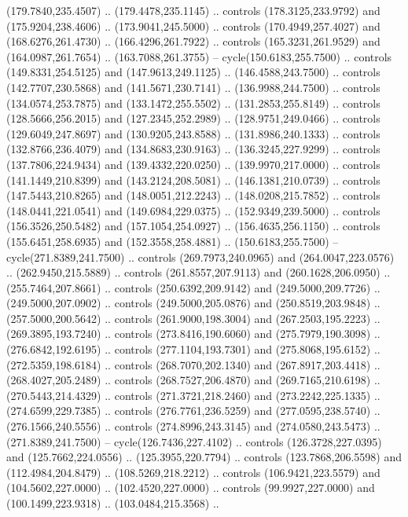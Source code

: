   (179.7840,235.4507) .. (179.4478,235.1145) .. controls (178.3125,233.9792) and
  (175.9204,238.4606) .. (173.9041,245.5000) .. controls (170.4949,257.4027) and
  (168.6276,261.4730) .. (166.4296,261.7922) .. controls (165.3231,261.9529) and
  (164.0987,261.7654) .. (163.7088,261.3755) -- cycle(150.6183,255.7500) ..
  controls (149.8331,254.5125) and (147.9613,249.1125) .. (146.4588,243.7500) ..
  controls (142.7707,230.5868) and (141.5671,230.7141) .. (136.9988,244.7500) ..
  controls (134.0574,253.7875) and (133.1472,255.5502) .. (131.2853,255.8149) ..
  controls (128.5666,256.2015) and (127.2345,252.2989) .. (128.9751,249.0466) ..
  controls (129.6049,247.8697) and (130.9205,243.8588) .. (131.8986,240.1333) ..
  controls (132.8766,236.4079) and (134.8683,230.9163) .. (136.3245,227.9299) ..
  controls (137.7806,224.9434) and (139.4332,220.0250) .. (139.9970,217.0000) ..
  controls (141.1449,210.8399) and (143.2124,208.5081) .. (146.1381,210.0739) ..
  controls (147.5443,210.8265) and (148.0051,212.2243) .. (148.0208,215.7852) ..
  controls (148.0441,221.0541) and (149.6984,229.0375) .. (152.9349,239.5000) ..
  controls (156.3526,250.5482) and (157.1054,254.0927) .. (156.4635,256.1150) ..
  controls (155.6451,258.6935) and (152.3558,258.4881) .. (150.6183,255.7500) --
  cycle(271.8389,241.7500) .. controls (269.7973,240.0965) and
  (264.0047,223.0576) .. (262.9450,215.5889) .. controls (261.8557,207.9113) and
  (260.1628,206.0950) .. (255.7464,207.8661) .. controls (250.6392,209.9142) and
  (249.5000,209.7726) .. (249.5000,207.0902) .. controls (249.5000,205.0876) and
  (250.8519,203.9848) .. (257.5000,200.5642) .. controls (261.9000,198.3004) and
  (267.2503,195.2223) .. (269.3895,193.7240) .. controls (273.8416,190.6060) and
  (275.7979,190.3098) .. (276.6842,192.6195) .. controls (277.1104,193.7301) and
  (275.8068,195.6152) .. (272.5359,198.6184) .. controls (268.7070,202.1340) and
  (267.8917,203.4418) .. (268.4027,205.2489) .. controls (268.7527,206.4870) and
  (269.7165,210.6198) .. (270.5443,214.4329) .. controls (271.3721,218.2460) and
  (273.2242,225.1335) .. (274.6599,229.7385) .. controls (276.7761,236.5259) and
  (277.0595,238.5740) .. (276.1566,240.5556) .. controls (274.8996,243.3145) and
  (274.0580,243.5473) .. (271.8389,241.7500) -- cycle(126.7436,227.4102) ..
  controls (126.3728,227.0395) and (125.7662,224.0556) .. (125.3955,220.7794) ..
  controls (123.7868,206.5598) and (112.4984,204.8479) .. (108.5269,218.2212) ..
  controls (106.9421,223.5579) and (104.5602,227.0000) .. (102.4520,227.0000) ..
  controls (99.9927,227.0000) and (100.1499,223.9318) .. (103.0484,215.3568) ..
